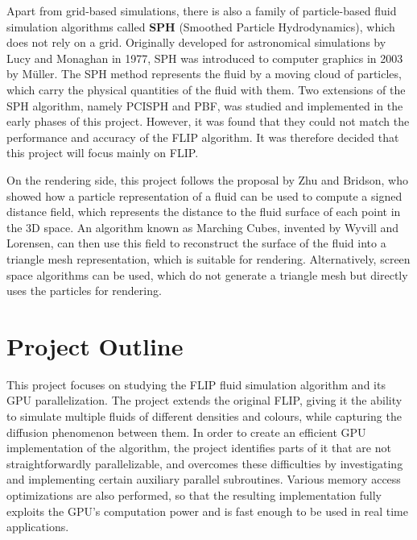 Apart from grid-based simulations, there is also a family of particle-based fluid simulation algorithms called \textbf{SPH} (Smoothed Particle Hydrodynamics), which does not rely on a grid. Originally developed for astronomical simulations by Lucy\cite{lucy1977numerical} and Monaghan \cite{monaghan1992smoothed} in 1977, SPH was introduced to computer graphics in 2003 by Müller\cite{muller2003particle}. The SPH method represents the fluid by a moving cloud of particles, which carry the physical quantities of the fluid with them. Two extensions of the SPH algorithm, namely PCISPH\cite{solenthaler2009predictive} and PBF\cite{macklin2013position}, was studied and implemented in the early phases of this project. However, it was found that they could not match the performance and accuracy of the FLIP algorithm. It was therefore decided that this project will focus mainly on FLIP.



On the rendering side, this project follows the proposal by Zhu and Bridson\cite{zhu2005animating}, who showed how a particle representation of a fluid can be used to compute a signed distance field, which represents the distance to the fluid surface of each point in the 3D space. An algorithm known as Marching Cubes, invented by Wyvill\cite{wyvill1986soft} and Lorensen\cite{lorensen1987marching}, can then use this field to reconstruct the surface of the fluid into a triangle mesh representation, which is suitable for rendering. Alternatively, screen space algorithms\cite{van2009screen} can be used, which do not generate a triangle mesh but directly uses the particles for rendering.



\section{Project Outline}


This project focuses on studying the FLIP fluid simulation algorithm and its GPU parallelization. The project extends the original FLIP, giving it the ability to simulate multiple fluids of different densities and colours, while capturing the diffusion phenomenon between them. In order to create an efficient GPU implementation of the algorithm, the project identifies parts of it that are not straightforwardly parallelizable, and overcomes these difficulties by investigating and implementing certain auxiliary parallel subroutines. Various memory access optimizations are also performed, so that the resulting implementation fully exploits the GPU's computation power and is fast enough to be used in real time applications.

